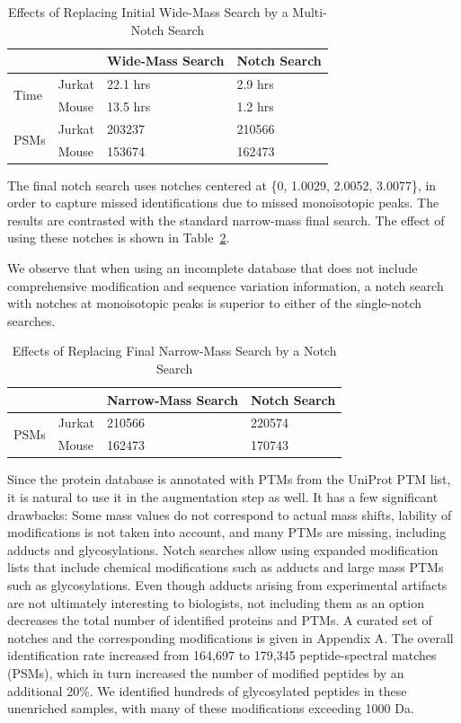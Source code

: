 \documentclass[journal=jprobs,manuscript=article]{achemso}
\begin{document}
\begin{table}[]
\centering
\caption{Effects of Replacing Initial Wide-Mass Search by a Multi-Notch Search}
\label{my-labelff}
\begin{tabular}{ll|l|l}
                      &        & Wide-Mass Search & Notch Search\\
\hline
\multirow{2}{*}{Time} & Jurkat & 22.1 hrs         & 2.9 hrs    \\
                      & Mouse  & 13.5 hrs         & 1.2 hrs   \\
\hline
\multirow{2}{*}{PSMs} & Jurkat & 203237           & 210566    \\
                      & Mouse  & 153674           & 162473   
\end{tabular}
\end{table}


The final notch search uses notches centered at \{0, 1.0029, 2.0052, 3.0077\}, in order to capture missed identifications due to missed monoisotopic peaks.
The results are contrasted with the standard narrow-mass final search.
The effect of using these notches is shown in Table~\ref{tab:table2}.

We observe that when using an incomplete database that does not include comprehensive modification and sequence variation information, a notch search with notches at monoisotopic peaks is superior to either of the single-notch searches.

\begin{table}[]
\centering
\caption{Effects of Replacing Final Narrow-Mass Search by a Notch Search}
\label{tab:table2}
\begin{tabular}{ll|l|l}
                      &        & Narrow-Mass Search & Notch Search\\
\hline
\multirow{2}{*}{PSMs} & Jurkat  & 210566   &  220574  \\
                      & Mouse    & 162473   &   170743
\end{tabular}
\end{table}

Since the protein database is annotated with PTMs from the UniProt PTM list, it is natural to use it in the augmentation step as well.
It has a few significant drawbacks: Some mass values do not correspond to actual mass shifts, lability of modifications is not taken into account, and many PTMs are missing, including adducts and glycosylations.
Notch searches allow using expanded modification lists that include chemical modifications such as adducts and large mass PTMs such as glycosylations.
Even though adducts arising from experimental artifacts are not ultimately interesting to biologists, not including them as an option decreases the total number of identified proteins and PTMs.
A curated set of notches and the corresponding modifications is given in Appendix A.
The overall identification rate increased from 164,697 to 179,345 peptide-spectral matches (PSMs), which in turn increased the number of modified peptides by an additional 20\%.
We identified hundreds of glycosylated peptides in these unenriched samples, with many of these modifications exceeding 1000 Da.
\end{document}
